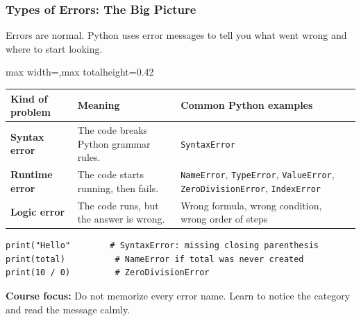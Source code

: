 \documentclass[aspectratio=169,10pt]{beamer}
\newcommand{\keyword}[1]{\textcolor{PrimaryBlue}{\textbf{#1}}}
\begin{document}
\begin{frame}[fragile]
\frametitle{Types of Errors: The Big Picture}
\begin{tcolorbox}[lecturebox,title=Key idea]
Errors are normal. Python uses error messages to tell you what went wrong and where to start looking.
\end{tcolorbox}

\small
\begin{adjustbox}{max width=\textwidth,max totalheight=0.42\textheight}
\begin{tabular}{@{}p{3.0cm}p{5.5cm}p{4.6cm}@{}}
\toprule
\textbf{Kind of problem} & \textbf{Meaning} & \textbf{Common Python examples} \\
\midrule
\textbf{Syntax error} & The code breaks Python grammar rules. & \texttt{SyntaxError} \\
\textbf{Runtime error} & The code starts running, then fails. & \texttt{NameError}, \texttt{TypeError}, \texttt{ValueError}, \texttt{ZeroDivisionError}, \texttt{IndexError} \\
\textbf{Logic error} & The code runs, but the answer is wrong. & Wrong formula, wrong condition, wrong order of steps \\
\bottomrule
\end{tabular}
\end{adjustbox}

\begin{lstlisting}[style=pycodesmall]
print("Hello"        # SyntaxError: missing closing parenthesis
print(total)          # NameError if total was never created
print(10 / 0)         # ZeroDivisionError
\end{lstlisting}

\vspace{0.05cm}
{\small \keyword{Course focus:} Do not memorize every error name. Learn to notice the category and read the message calmly.}
\end{frame}
\end{document}
